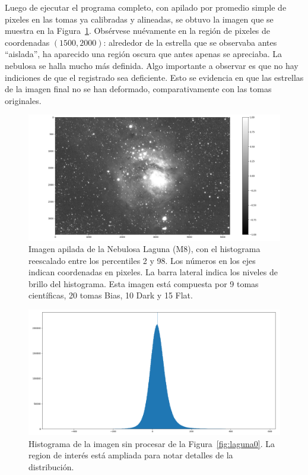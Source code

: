 \documentclass[a4paper, 12pt]{article}
\begin{document}
Luego de ejecutar el programa completo, con apilado por promedio simple de pixeles en las tomas ya calibradas y alineadas, se obtuvo la imagen que se muestra en la Figura~\ref{fig:apiladofinal}. Obsérvese nuévamente en la región  de pixeles de coordenadas $(1500, 2000)$: alrededor de la estrella que se observaba antes ``aislada'', ha aparecido una región oscura que antes apenas se apreciaba. La nebulosa se halla mucho más definida. Algo importante a observar es que no hay indiciones de que el registrado sea deficiente. Esto se evidencia en que las estrellas de la imagen final no se han deformado, comparativamente con las tomas originales.

\begin{figure}[!h]
  \centering
  \includegraphics[width=\textwidth]{img/apiladofinal_scikit.png}
  \caption{\label{fig:apiladofinal} Imagen apilada de la Nebulosa Laguna (M8), con el histograma reescalado entre los percentiles 2 y 98. Los números en los ejes indican coordenadas en pixeles. La barra lateral indica los niveles de brillo del histograma. Esta imagen está compuesta por 9 tomas científicas, 20 tomas Bias, 10 Dark y 15 Flat.}
\end{figure}



\begin{figure}[!h]
  \centering
  \includegraphics[width=\textwidth]{img/histo_00004.png}
  \caption{\label{fig:histo_sp} Histograma de la imagen sin procesar de la Figura~\ref{fig:laguna0}. La region de interés está ampliada para notar detalles de la distribución.}
\end{figure}
\end{document}
